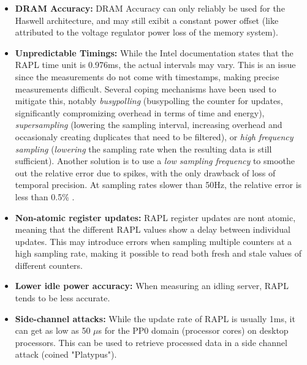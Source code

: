 \begin{itemize}
    \item \textbf{DRAM Accuracy: }DRAM Accuracy can only reliably be used for the Haswell architecture\parencite{desrochers2016validation, khan2018rapl, alt2024experimental}, and may still exibit a constant power offset (like attributed to the voltage regulator power loss of the memory system).
    \item \textbf{Unpredictable Timings: }While the Intel documentation states that the RAPL time unit is 0.976ms, the actual intervals may vary. This is an issue since the measurements do not come with timestamps, making precise measurements difficult\parencite{khan2018rapl}. Several coping mechanisms have been used to mitigate this, notably \textit{busypolling} (busypolling the counter for updates, significantly compromizing overhead in terms of time and energy\parencite{hahnel2012measuring}), \textit{supersampling} (lowering the sampling interval, increasing overhead and occasionaly creating duplicates that need to be filtered\parencite{khan2018rapl}), or \textit{high frequency sampling} (\textit{lowering} the sampling rate when the resulting data is still sufficient\parencite{servat2016detailed}). Another solution is to use a \textit{low sampling frequency} to smoothe out the relative error due to spikes, with the only drawback of loss of temporal precision. At sampling rates slower than 50Hz, the relative error is less than 0.5\% \parencite{jay2023experimental}.
    \item \textbf{Non-atomic register updates: } RAPL register updates are nont atomic\parencite{khan2018rapl}, meaning that the different RAPL values show a delay between individual updates. This may introduce errors when sampling multiple counters at a high sampling rate, making it possible to read both fresh and stale values of different counters.
    \item \textbf{Lower idle power accuracy: } When measuring an idling server, RAPL tends to be less accurate\parencite{schone2024energy, desrochers2016validation}.
    \item \textbf{Side-channel attacks: } While the update rate of RAPL is usually 1ms, it can get as low as 50 $\mu$s for the PP0 domain (processor cores) on desktop processors\parencite{schone2024energy}. This can be used to retrieve processed data in a side channel attack (coined "Platypus")\parencite{lipp2021platypus, schone2024energy}. 
    

\end{itemize}
